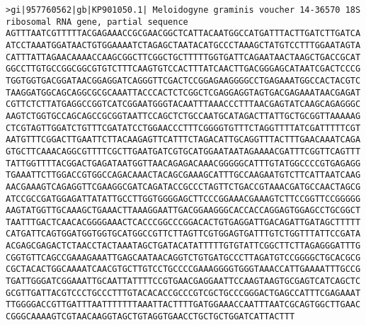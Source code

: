 \documentclass[11pt]{article}
\begin{document}
\begin{Verbatim}[commandchars=\\\{\}]
>gi|957760562|gb|KP901050.1| Meloidogyne graminis voucher 14-36570 18S ribosomal RNA gene, partial sequence
AGTTTAATCGTTTTTACGAGAAACCGCGAACGGCTCATTACAATGGCCATGATTTACTTGATCTTGATCA
ATCCTAAATGGATAACTGTGGAAAATCTAGAGCTAATACATGCCCTAAAGCTATGTCCTTTGGAATAGTA
CATTTATTAGAACAAAACCAAGCGGCTTCGGCTGCTTTTTGGTGATTCAGAATAACTAAGCTGACCGCAT
GGCCTTGTGCCGGCGGCGTGTCTTTCAAGTGTCCACTTTATCAACTTGACGGGAGCATAATCGACTCCCG
TGGTGGTGACGGATAACGGAGGATCAGGGTTCGACTCCGGAGAAGGGGCCTGAGAAATGGCCACTACGTC
TAAGGATGGCAGCAGGCGCGCAAATTACCCACTCTCGGCTCGAGGAGGTAGTGACGAGAAATAACGAGAT
CGTTCTCTTATGAGGCCGGTCATCGGAATGGGTACAATTTAAACCCTTTAACGAGTATCAAGCAGAGGGC
AAGTCTGGTGCCAGCAGCCGCGGTAATTCCAGCTCTGCCAATGCATAGACTTATTGCTGCGGTTAAAAAG
CTCGTAGTTGGATCTGTTTCGATATCCTGGAACCCTTTCGGGGTGTTTCTAGGTTTTATCGATTTTTCGT
AATGTTTCGGACTTGAATTCTTACAAGAGTTCATTTCTAGACATTGCAGGTTTACTTTGAACAAATCAGA
GTGCTTCAAACAGGCGTTTTCGCTTGAATGATCGTGCATGGAATAATAGAAAACGATTTCGGTTCAGTTT
TATTGGTTTTACGGACTGAGATAATGGTTAACAGAGACAAACGGGGGCATTTGTATGGCCCCGTGAGAGG
TGAAATTCTTGGACCGTGGCCAGACAAACTACAGCGAAAGCATTTGCCAAGAATGTCTTCATTAATCAAG
AACGAAAGTCAGAGGTTCGAAGGCGATCAGATACCGCCCTAGTTCTGACCGTAAACGATGCCAACTAGCG
ATCCGCCGATGGAGATTATATTGCCTTGGTGGGGAGCTTCCCGGAAACGAAAGTCTTCCGGTTCCGGGGG
AAGTATGGTTGCAAAGCTGAAACTTAAAGGAATTGACGGAAGGGCACCACCAGGAGTGGAGCCTGCGGCT
TAATTTGACTCAACACGGGGAAACTCACCCGGCCCGGACACTGTGAGGATTGACAGATTGATAGCTTTTT
CATGATTCAGTGGATGGTGGTGCATGGCCGTTCTTAGTTCGTGGAGTGATTTGTCTGGTTTATTCCGATA
ACGAGCGAGACTCTAACCTACTAAATAGCTGATACATATTTTTGTGTATTCGGCTTCTTAGAGGGATTTG
CGGTGTTCAGCCGAAAGAAATTGAGCAATAACAGGTCTGTGATGCCCTTAGATGTCCGGGGCTGCACGCG
CGCTACACTGGCAAAATCAACGTGCTTGTCCTGCCCCGAAAGGGGTGGGTAAACCATTGAAAATTTGCCG
TGATTGGGATCGGAAATTGCAATTATTTTCCGTGAACGAGGAATTCCAAGTAAGTGCGAGTCATCAGCTC
GCGTTGATTACGTCCCTGCCCTTTGTACACACCGCCCGTCGCTGCCCGGGACTGAGCCATTTCGAGAAAT
TTGGGGACCGTTGATTTAATTTTTTTAAATTACTTTTGATGGAAACCAATTTAATCGCAGTGGCTTGAAC
CGGGCAAAAGTCGTAACAAGGTAGCTGTAGGTGAACCTGCTGCTGGATCATTACTTT


\end{Verbatim}
\end{document}
